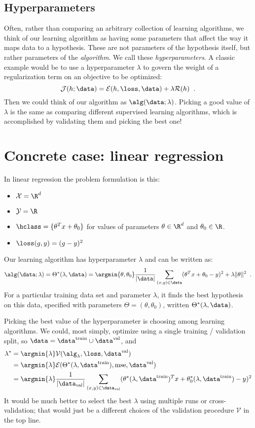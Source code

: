   \subsection{Hyperparameters}
  Often, rather than comparing an arbitrary collection of learning algorithms,
  we think of our learning algorithm as having some parameters that
  affect the way it maps data to a hypothesis.  These are not
  parameters of the hypothesis itself, but rather parameters of the
  {\em algorithm}.  We call these {\em hyperparameters}.  A classic
  example would be to use a hyperparameter $\lambda$ to govern the weight of a
  regularization term on an objective to be optimized:
  \[\mathcal{J}(h; \data) = \mathcal{E}(h,\loss, \data) +
    \lambda \mathcal{R}(h)\;\;.\]
  Then we could think of our algorithm as $\alg(\data;
  \lambda)$.
  Picking a good value of $\lambda$ is the same as comparing different
  supervised learning algorithms, which is accomplished by validating
  them and picking the best one! 

\section{Concrete case: linear regression}
In linear regression the problem formulation is this:
\begin{itemize}
  \item $\mathcal{X} = \R^d$
  \item $\mathcal{Y} = \R$
  \item $\hclass = \{\theta^T x + \theta_0\}$ for values of
    parameters $\theta \in \R^d$ and $\theta_0 \in \R$.
  \item $\loss(g, y) = (g - y)^2$
  \end{itemize}

Our learning algorithm has hyperparameter $\lambda$ and can be written
as:
\[\alg(\data; \lambda) = \Theta^*(\lambda, \data) = \argmin{\theta, \theta_0}
    \frac{1}{|\data|} \sum_{(x, y) \in \data} (\theta^Tx +
    \theta_0 - y)^2 + \lambda\|\theta\|^2 \;\;.\]
 For a particular training data set and parameter $\lambda$, it finds
 the best hypothesis on this data, specified with parameters $\Theta =
 (\theta, \theta_0)$, written  $\Theta^*(\lambda, \data)$.

 Picking the best value of the hyperparameter is choosing among
 learning algorithms. We could, most simply,
 optimize using a single training / validation split, so $\data =
 \data^\text{train} \cup \data^\text{val}$, and
\begin{align*}
\lambda^* & = \argmin{\lambda} \mathcal{V}(\alg_\lambda, \loss,
            \data^\text{val})\\
  & = \argmin{\lambda} \mathcal{E}(\Theta^*(\lambda, \data^\text{train}), \text{mse},
    \data^\text{val}) \\
  & = \argmin{\lambda} \frac{1}{|\data_\text{val}|} \sum_{(x, y) \in
    \data_\text{val}} (\theta^*(\lambda, \data^\text{train})^T x +
    \theta^*_0(\lambda, \data^\text{train}) - y)^2
\end{align*}
It would be much better to select the best $\lambda$ using multiple
runs or cross-validation;  that would just be a different choices of
the validation procedure $\mathcal{V}$ in the top line.


